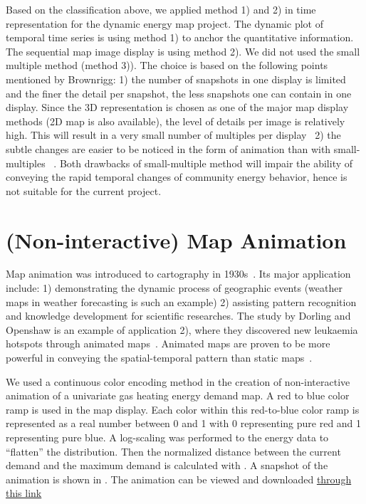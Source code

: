 Based on the classification above, we applied method 1) and 2) in time
representation for the dynamic energy map project. The dynamic plot of
temporal time series is using method 1) to anchor the quantitative
information. The sequential map image display is using method 2). We
did not used the small multiple method (method 3)). The choice is
based on the following points mentioned by Brownrigg: 1) the number of
snapshots in one display is limited and the finer the detail per
snapshot, the less snapshots one can contain in one display. Since the
3D representation is chosen as one of the major map display methods
(2D map is also available), the level of details per image is
relatively high. This will result in a very small number of multiples
per display~\cite{Brownrigg2005} 2) the subtle changes are easier to
be noticed in the form of animation than with small-multiples
~\cite{Brownrigg2005}. Both drawbacks of small-multiple method will
impair the ability of conveying the rapid temporal changes of
community energy behavior, hence is not suitable for the current
project.

\section{(Non-interactive) Map Animation} \label{anime} 

Map animation was introduced to cartography in
1930s~\cite{Harrower2008}. Its major application include: 1)
demonstrating the dynamic process of geographic events (weather maps
in weather forecasting is such an example) 2) assisting pattern
recognition and knowledge development for scientific researches. The
study by Dorling and Openshaw is an example of application 2), where
they discovered new leukaemia hotspots through animated
maps~\cite{Dorling1992}.  Animated maps are proven to be more powerful
in conveying the spatial-temporal pattern than static
maps~\cite{McEachern1998}.

We used a continuous color encoding method in the creation of
non-interactive animation of a univariate gas heating energy demand
map. A red to blue color ramp is used in the map display. Each color
within this red-to-blue color ramp is represented as a real number
between 0 and 1 with 0 representing pure red and 1 representing pure
blue. A log-scaling was performed to the energy data to ``flatten''
the distribution. Then the normalized distance between the current
demand and the maximum demand is calculated with . A
snapshot of the animation is shown in . The
animation can be viewed and downloaded
\href{http://www.armechxyj.com/energy-mapping.html#colorAnime}{through
  this link}

